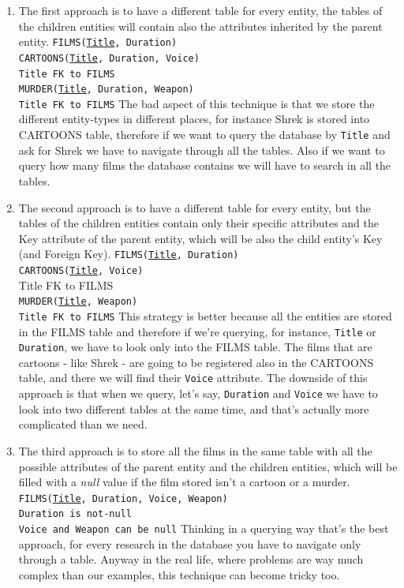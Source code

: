 \documentclass[12pt, oneside]{report}
\newcommand\tab[1][1cm]{\hspace*{#1}}
\begin{document}
\begin{enumerate}
	\item The first approach is to have a different table for every entity, the tables of the children entities will contain also the attributes inherited by the parent entity.
	\vskip 5pt
	\texttt{FILMS(\underline{Title}, Duration)}\\
	\texttt{CARTOONS(\underline{Title}, Duration, Voice)}\\
	  	\tab[.8cm] \texttt{Title FK to FILMS}\\
	\texttt{MURDER(\underline{Title}, Duration, Weapon)}\\
		\tab[.8cm] \texttt{Title FK to FILMS}
	\vskip 5pt
	The bad aspect of this technique is that we store the different entity-types in different places, for instance Shrek is stored into CARTOONS table, therefore if we want to query the database by \texttt{Title} and ask for Shrek we have to navigate through all the tables. Also if we want to query how many films the database contains we will have to search in all the tables.
	\item The second approach is to have a different table for every entity, but the tables of the children entities contain only their specific attributes and the Key attribute of the parent entity, which will be also the child entity's Key (and Foreign Key).
	\vskip 5pt
	\texttt{FILMS(\underline{Title}, Duration)}\\
	\texttt{CARTOONS(\underline{Title}, Voice)}\\
	  	\tab[.8cm] Title FK to FILMS\\
	\texttt{MURDER(\underline{Title}, Weapon)}\\
		\tab[.8cm] \texttt{Title FK to FILMS}
	\vskip 5pt
	This strategy is better because all the entities are stored in the FILMS table and therefore if we're querying, for instance, \texttt{Title} or \texttt{Duration}, we have to look only into the FILMS table. The films that are cartoons - like Shrek - are going to be registered also in the CARTOONS table, and there we will find their \texttt{Voice} attribute.
	The downside of this approach is that when we query, let's say, \texttt{Duration} and \texttt{Voice} we have to look into two different tables at the same time, and that's actually more complicated than we need.
	\item The third approach is to store all the films in the same table with all the possible attributes of the parent entity and the children entities, which will be filled with a \emph{null} value if the film stored isn't a cartoon or a murder.
	\vskip 5pt
	\texttt{FILMS(\underline{Title}, Duration, Voice, Weapon)}\\
	\tab[.4cm] \texttt{Duration is not-null}\\
	\tab[.4cm] \texttt{Voice and Weapon can be null}
	\vskip 5pt
	Thinking in a querying way that's the best approach, for every research in the database you have to navigate only through a table. Anyway in the real life, where problems are way much complex than our examples, this technique can become tricky too.
\end{enumerate}
\end{document}
